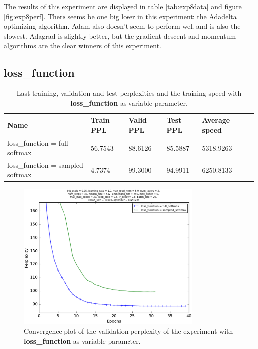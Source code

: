 \documentclass[10pt,a4paper,titlepage]{article}
\begin{document}
The results of this experiment are displayed in table \ref{tab:exp8data} and figure \ref{fig:exp8perf}. There seems be one big loser in this experiment: the Adadelta optimizing algorithm. Adam also doesn't seem to perform well and is also the slowest. Adagrad is slightly better, but the gradient descent and momentum algorithms are the clear winners of this experiment. 

\newpage

\subsection{loss\_function}

\begin{table}[H]
\centering
\caption{Last training, validation and test perplexities and the training speed with \textbf{loss\_function} as variable parameter.}
\label{tab:exp9data}
\begin{tabular}{|l|l|l|l|l|l|}
\hline
{\small Name} & {\small Train PPL} & {\small Valid PPL} & {\small Test PPL} & {\small Average speed}\\ \hline
{\small loss\_function = full softmax }                 & 56.7543    & 88.6126    & 85.5887    & 5318.9263  \\ \hline
{\small loss\_function = sampled softmax }              & 4.7374     & 99.3000    & 94.9911    & 6250.8133  \\ \hline
\end{tabular}
\end{table}

\begin{figure}[H]
	\begin{center}
		\includegraphics[width=0.80\textwidth]{Figures/lossperf.eps}
		\caption{Convergence plot of the validation perplexity of the experiment with \textbf{loss\_function} as variable parameter. }
		\label{fig:exp9perf}
	\end{center}	
\end{figure}
\end{document}
